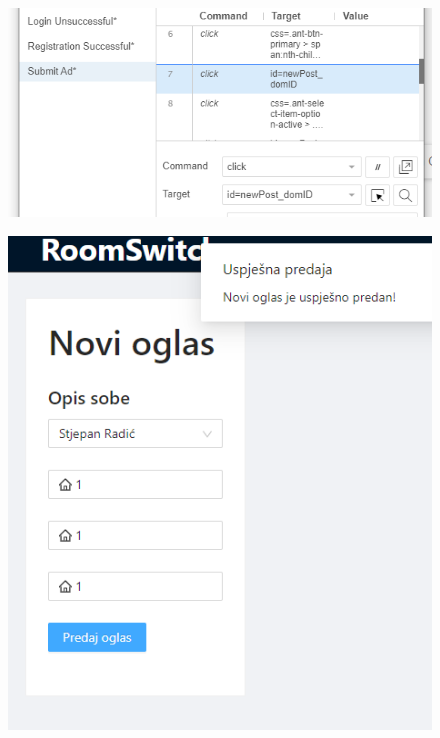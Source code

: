 			\begin{figure}[H]
				\includegraphics[scale=0.6]{slike/test10.PNG} %
				\centering
				\label{fig:test10}
			\end{figure}
			\begin{figure}[H]
				\includegraphics[scale=0.6]{slike/test10pom.PNG} %
				\centering
				\label{fig:test10pom}
			\end{figure}
